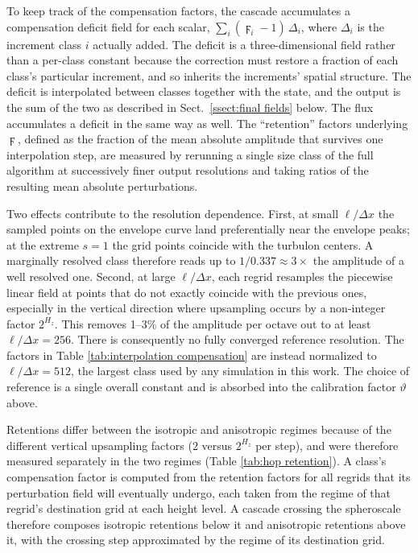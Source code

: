\documentclass{article}
\begin{document}
To keep track of the compensation factors, the cascade accumulates a compensation deficit field for each scalar, $\sum_i (\digamma_i - 1)\,\Delta_i$, where $\Delta_i$ is the increment class $i$ actually added. The deficit is a three-dimensional field rather than a per-class constant because the correction must restore a fraction of each class's particular increment, and so inherits the increments' spatial structure. The deficit is interpolated between classes together with the state, and the output is the sum of the two as described in Sect.~\ref{ssect:final fields} below. The flux accumulates a deficit in the same way as well. The ``retention'' factors underlying $\digamma$, defined as the fraction of the mean absolute amplitude that survives one interpolation step, are measured by rerunning a single size class of the full algorithm at successively finer output resolutions and taking ratios of the resulting mean absolute perturbations.

Two effects contribute to the resolution dependence. First, at small $\ell/\Delta x$ the sampled points on the envelope curve land preferentially near the envelope peaks; at the extreme $s = 1$ the grid points coincide with the turbulon centers. A marginally resolved class therefore reads up to $1/0.337 \approx 3\times$ the amplitude of a well resolved one. Second, at large $\ell/\Delta x$, each regrid resamples the piecewise linear field at points that do not exactly coincide with the previous ones, especially in the vertical direction where upsampling occurs by a non-integer factor $2^{H_z}$. This removes 1--3\% of the amplitude per octave out to at least $\ell/\Delta x = 256$. There is consequently no fully converged reference resolution. The factors in Table \ref{tab:interpolation compensation} are instead normalized to $\ell/\Delta x = 512$, the largest class used by any simulation in this work. The choice of reference is a single overall constant and is absorbed into the calibration factor $\vartheta$ above.

Retentions differ between the isotropic and anisotropic regimes because of the different vertical upsampling factors ($2$ versus $2^{H_z}$ per step), and were therefore measured separately in the two regimes (Table \ref{tab:hop retention}). A class's compensation factor is computed from the retention factors for all regrids that its perturbation field will eventually undergo, each taken from the regime of that regrid's destination grid at each height level. A cascade crossing the spheroscale therefore composes isotropic retentions below it and anisotropic retentions above it, with the crossing step approximated by the regime of its destination grid.
\end{document}
